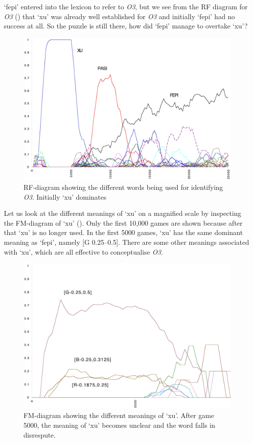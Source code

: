 `fepi' entered into the lexicon to refer to \emph{O3}, but we see
from the RF diagram for \emph{O3} () that 
`xu' was already well established for \emph{O3} and initially 
`fepi' had no success at all. 
So the puzzle is still there, how did `fepi' manage to 
overtake `xu'? 

\begin{figure}[htbp]
  \centerline{\includegraphics[width=.80\textwidth]{chap7/figs/RF-O3.pdf}}
\caption{\label{RF-O3a}RF-diagram showing the different
words being used for identifying \emph{O3}. Initially `xu' 
dominates }
\end{figure}
Let us look at the different meanings of `xu' on 
a magnified scale by 
inspecting the FM-diagram of `xu' (). 
Only the first 10,000 games are shown because after
that `xu' is no longer used. In the first 5000 games,  
`xu' has the same dominant meaning as `fepi', namely
[G 0.25–0.5]. There are some other meanings 
associated with `xu', which are all effective 
to conceptualise \emph{O3}.

\begin{figure}[htbp]
  \centerline{\includegraphics[width=.80\textwidth]{chap7/figs/FM-XU.pdf}}
\caption{\label{FM-XU.f}FM-diagram showing the different
meanings of `xu'. After game 5000, the meaning of `xu' becomes
unclear and the word falls in disrespute.}
\end{figure}

